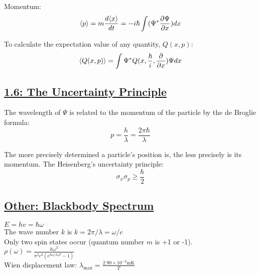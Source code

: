 Momentum:
    $$\langle p \rangle = m \frac{d \langle x \rangle}{dt} = -i \hbar \int (\Psi^* \pdv{\Psi}{x}) dx$$

To calculate the expectation value of any quantity, $Q(x, p)$:
$$\langle Q(x, p) \rangle = \int \Psi^* Q(x, \frac{\hbar}{i}, \pdv{}{x}) \Psi dx$$

\subsection{\underline{1.6: The Uncertainty Principle}}
The wavelength of $\Psi$ is related to the momentum of the particle by the de Broglie formula:
    $$p = \frac{h}{\lambda} = \frac{2 \pi \hbar}{\lambda}$$

The more precisely determined a particle's position is, the less precisely is its momentum. The Heisenberg's uncertainty principle:
    $$\sigma_x \sigma_p \geq \frac{\hbar}{2}$$

\subsection{\underline{Other: Blackbody Spectrum}}
$E = hv = \hbar \omega$ \\
The wave number $k$ is $k = 2 \pi / \lambda = \omega / c$ \\
Only two spin states occur (quantum number $m$ is +1 or -1). \\

$\rho(\omega) = \frac{\hbar \omega^3}{\pi^2 c^3 (e^{\hbar \omega / {k_b T}} - 1)}$ \\
Wien displacement law: $\lambda_{\text{max}} = \frac{2.90 \times 10^{-3} \text{mK}}{T}$ \\
